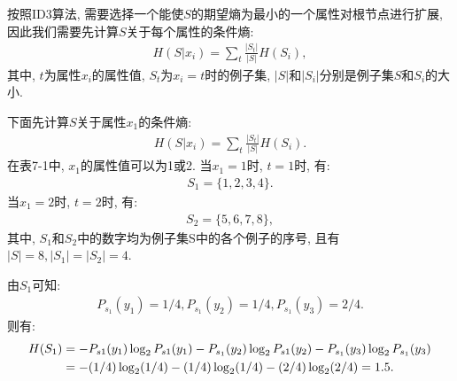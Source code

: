 按照ID3算法, 需要选择一个能使$S$的期望熵为最小的一个属性对根节点进行扩展, 因此我们需要先计算$S$关于每个属性的条件熵:
\begin{align}
    H\left (S | x_{i}\right)=\sum_{t} \frac{\left|S_{t}\right|}{|S|} H\left (S_{i}\right),
\end{align}
其中, $t$为属性$x_i$的属性值, $S_t$为$x_i=t$时的例子集, $|S|$和$|S_i|$分别是例子集$S$和$S_i$的大小.

下面先计算$S$关于属性$x_1$的条件熵:
\begin{align}
    H\left (S|x_{i}\right)=\sum_{t} \frac{\left|S_{t}\right|}{|S|} H\left (S_{i}\right).
\end{align}
在表7-1中, $x_1$的属性值可以为1或2. 当$x_1=1$时, $t=1$时, 有:
\begin{align}
    S_1=\{1, 2, 3, 4\}.
\end{align}
当$x_1=2$时, $t=2$时, 有:
\begin{align}
    S_2=\{5, 6, 7, 8\},
\end{align}
其中, $S_1$和$S_2$中的数字均为例子集S中的各个例子的序号, 且有$|S|=8,|S_1|=|S_2|=4$.

由$S_1$可知:
\begin{align}
    P_{s_1} (y_1)=1/4,     P_{s_1} (y_2)=1/4,     P_{s_1} (y_3)=2/4.
\end{align}
则有:
\begin{align}
    H (S_1)&= - P_{s1} (y_1)\log_2 P_{s1} (y_1) - P_{s_1} (y_2)\log_2 P_{s1} (y_2 )- P_{s_1} (y_3)\log_2 P_{s_1} (y_3 )\notag\\
           &= - (1/4)\log_2 (1/4)- (1/4)\log_2 (1/4)- (2/4)\log_2 (2/4) =1.5.
\end{align}

